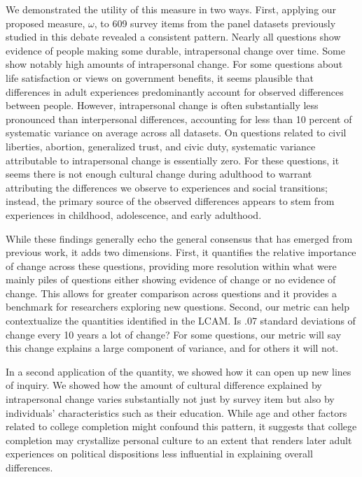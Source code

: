 \documentclass[
  12pt,
]{article}
\begin{document}
We demonstrated the utility of this measure in two ways. First, applying
our proposed measure, \(\omega\), to 609 survey items from the panel
datasets previously studied in this debate revealed a consistent
pattern. Nearly all questions show evidence of people making some
durable, intrapersonal change over time. Some show notably high amounts
of intrapersonal change. For some questions about life satisfaction or
views on government benefits, it seems plausible that differences in
adult experiences predominantly account for observed differences between
people. However, intrapersonal change is often substantially less
pronounced than interpersonal differences, accounting for less than 10
percent of systematic variance on average across all datasets. On
questions related to civil liberties, abortion, generalized trust, and
civic duty, systematic variance attributable to intrapersonal change is
essentially zero. For these questions, it seems there is not enough
cultural change during adulthood to warrant attributing the differences
we observe to experiences and social transitions; instead, the primary
source of the observed differences appears to stem from experiences in
childhood, adolescence, and early adulthood.

While these findings generally echo the general consensus that has
emerged from previous work, it adds two dimensions. First, it quantifies
the relative importance of change across these questions, providing more
resolution within what were mainly piles of questions either showing
evidence of change or no evidence of change. This allows for greater
comparison across questions and it provides a benchmark for researchers
exploring new questions. Second, our metric can help contextualize the
quantities identified in the LCAM. Is .07 standard deviations of change
every 10 years a lot of change? For some questions, our metric will say
this change explains a large component of variance, and for others it
will not.

In a second application of the quantity, we showed how it can open up
new lines of inquiry. We showed how the amount of cultural difference
explained by intrapersonal change varies substantially not just by
survey item but also by individuals' characteristics such as their
education. While age and other factors related to college completion
might confound this pattern, it suggests that college completion may
crystallize personal culture to an extent that renders later adult
experiences on political dispositions less influential in explaining
overall differences.
\end{document}
